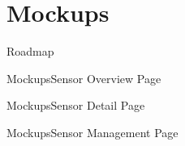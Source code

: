 \documentclass{beamer}
\begin{document}
  \renewcommand{\sectitle}{Mockups}
  \section{\sectitle}
  \begin{frame}{Roadmap}
    \tableofcontents[currentsection]
  \end{frame}

  \begin{frame}{\sectitle}{Sensor Overview Page}
    \begin{center}
    \end{center}
  \end{frame}

  \begin{frame}{\sectitle}{Sensor Detail Page}
    \begin{center}
    \end{center}
  \end{frame}

  \begin{frame}{\sectitle}{Sensor Management Page}
    \begin{center}
    \end{center}
  \end{frame}
\end{document}
